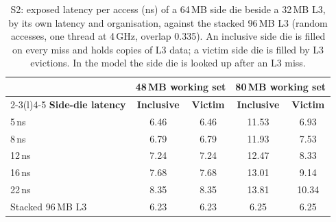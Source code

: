 \begin{table}[htbp]
  \centering
  \caption[S2: a side die against the stacked L3]{S2: exposed latency per access (ns) of a 64\,MB side die beside a 32\,MB L3, by its own latency and organisation, against the stacked 96\,MB L3 (random accesses, one thread at 4\,GHz, overlap 0.335). An inclusive side die is filled on every miss and holds copies of L3 data; a victim side die is filled by L3 evictions. In the model the side die is looked up after an L3 miss.}
  \label{tab:sim-side-die}
  \small
  \begin{tabular}{@{}lcccc@{}}
    \toprule
    & \multicolumn{2}{c}{\textbf{48\,MB working set}} & \multicolumn{2}{c}{\textbf{80\,MB working set}} \\ \cmidrule(lr){2-3}\cmidrule(l){4-5}
    \textbf{Side-die latency} & \textbf{Inclusive} & \textbf{Victim} & \textbf{Inclusive} & \textbf{Victim} \\
    \midrule
    5\,ns & 6.46 & 6.46 & 11.53 & 6.93 \\
    8\,ns & 6.79 & 6.79 & 11.93 & 7.53 \\
    12\,ns & 7.24 & 7.24 & 12.47 & 8.33 \\
    16\,ns & 7.68 & 7.68 & 13.01 & 9.14 \\
    22\,ns & 8.35 & 8.35 & 13.81 & 10.34 \\
    Stacked 96\,MB L3 & 6.23 & 6.23 & 6.25 & 6.25 \\
    \bottomrule
  \end{tabular}
\end{table}
